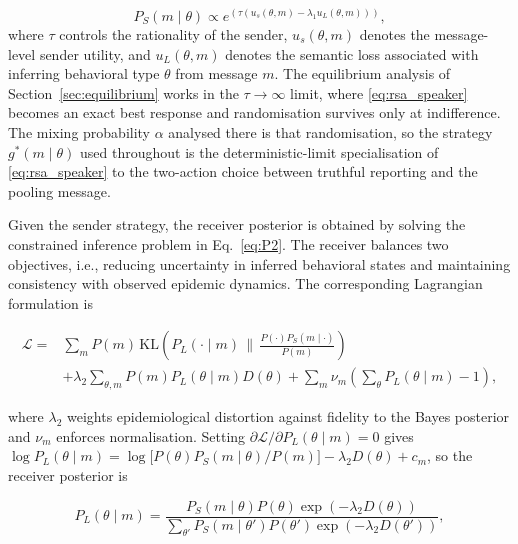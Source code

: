 \documentclass[sigconf,review]{acmart}
\begin{document}
\begin{equation} 
P_S(m\mid\theta) \propto e^ {\left( \tau \left(u_s(\theta,m) - \lambda_1 u_L(\theta,m) \right) \right)}, 
\label{eq:rsa_speaker} 
\end{equation} 
where $\tau$ controls the rationality of the sender, $u_s(\theta,m)$ denotes the message-level sender utility, and $u_L(\theta,m)$ denotes the semantic loss associated with inferring behavioral type $\theta$ from message $m$. The equilibrium analysis of Section~\ref{sec:equilibrium} works in the $\tau\to\infty$ limit, where \eqref{eq:rsa_speaker} becomes an exact best response and randomisation survives only at indifference. The mixing probability $\alpha$ analysed there is that randomisation, so the strategy $g^{*}(m\mid\theta)$ used throughout is the deterministic-limit specialisation of \eqref{eq:rsa_speaker} to the two-action choice between truthful reporting and the pooling message.

Given the sender strategy, the receiver posterior is obtained by solving
the constrained inference problem in Eq.~\eqref{eq:P2}. The receiver balances two objectives, i.e., reducing uncertainty in inferred behavioral states and maintaining consistency with observed epidemic dynamics.
The corresponding Lagrangian formulation is

\begin{equation}
\begin{aligned}
\mathcal{L}
=&
\sum_{m}
P(m)\,
\mathrm{KL}\!\left(
P_L(\cdot\mid m)\,\big\|\,
\tfrac{P(\cdot)P_S(m\mid\cdot)}{P(m)}
\right)
\\
&
+\lambda_2
\sum_{\theta,m}
P(m)P_L(\theta\mid m)D(\theta)
+\sum_{m}\nu_m\!\left(\sum_{\theta}P_L(\theta\mid m)-1\right),
\end{aligned}
\label{eq:Lagrangian_receiver}
\end{equation}

where $\lambda_2$ weights epidemiological distortion against fidelity to the Bayes
posterior and $\nu_m$ enforces normalisation. Setting
$\partial\mathcal L/\partial P_L(\theta\mid m)=0$ gives
$\log P_L(\theta\mid m)=\log\bigl[P(\theta)P_S(m\mid\theta)/P(m)\bigr]-\lambda_2D(\theta)+c_m$,
so the receiver posterior is

\begin{equation}
P_L(\theta\mid m)
=
\frac{
P_S(m\mid\theta)P(\theta)
\exp(-\lambda_2D(\theta))
}
{
\sum_{\theta'}
P_S(m\mid\theta')
P(\theta')
\exp(-\lambda_2D(\theta'))
},
\label{eq:posterior_solution}
\end{equation}
\end{document}
